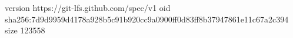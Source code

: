 version https://git-lfs.github.com/spec/v1
oid sha256:7d9d9959d4178a928b5c91b920cc9a0900ff0d83ff8b37947861e11c67a2c394
size 123558
